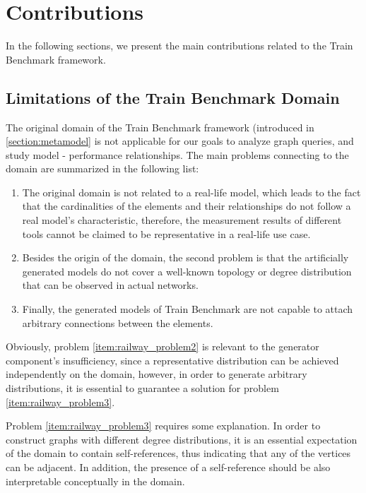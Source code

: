 \chapter{Contributions}

In the following sections, we present the main contributions related to the Train Benchmark framework.

\section{Limitations of the Train Benchmark Domain}\label{sec:railway}

The original domain of the Train Benchmark framework (introduced in \ref{section:metamodel} is not applicable for our goals to analyze graph queries, and study model - performance relationships. The main problems connecting to the domain are summarized in the following list:
\begin{enumerate}
	\item The original domain is not related to a real-life model, which leads to the fact that the cardinalities of the elements and their relationships do not follow a real model's characteristic, therefore, the measurement results of different tools cannot be claimed to be representative in a real-life use case. \label{item:railway_problem1}
	\item Besides the origin of the domain, the second problem is that the artificially generated models do not cover a well-known topology or degree distribution that can be observed in actual networks. \label{item:railway_problem2}
	\item Finally, the generated models of Train Benchmark are not capable to attach arbitrary connections between the elements. \label{item:railway_problem3}
\end{enumerate}

Obviously, problem \ref{item:railway_problem2} is relevant to the generator component's insufficiency, since a representative distribution can be achieved independently on the domain, however, in order to generate arbitrary distributions, it is essential to guarantee a solution for problem \ref{item:railway_problem3}.

Problem \ref{item:railway_problem3} requires some explanation. In order to construct graphs with different degree distributions, it is an essential expectation of the domain to contain self-references, thus indicating that any of the vertices can be adjacent. In addition, the presence of a self-reference should be also interpretable conceptually in the domain. %

